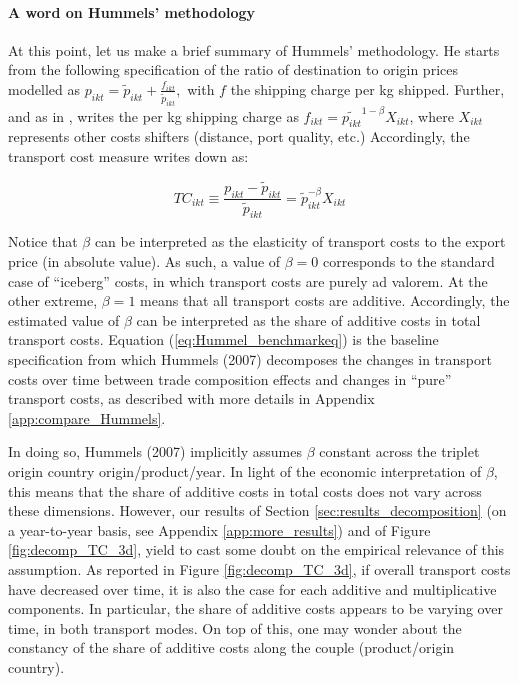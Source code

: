 \documentclass[a4paper,11pt]{article}
\begin{document}
\paragraph{A word on Hummels' methodology} At this point, let us make a brief summary of Hummels' methodology\nocite{hummels2007}. He starts from the following specification of the ratio of destination to origin prices modelled as $p_{ikt} = \widetilde{p}_{ikt}+\frac{f_{ikt}}{ \widetilde{p}_{ikt}},$ with $f$ the shipping charge per kg shipped. Further, and as in \cite{hummels_skiba}, \cite{hummels2007} writes the per kg shipping charge as $f_{ikt}=\widetilde{p_{ikt}}^{1-\beta}X_{ikt}$, where $X_{ikt}$ represents other costs shifters (distance, port quality, etc.) Accordingly, the transport cost measure writes down as:

\begin{equation}
TC_{ikt}\equiv \frac{p_{ikt}-\widetilde{p}_{ikt}}{\widetilde{p}_{ikt}} = \widetilde{p}_{ikt}^{-\beta}X_{ikt} \label{eq:Hummel_benchmarkeq}
\end{equation}

Notice that $\beta$ can be interpreted as the elasticity of transport costs to the export price (in absolute value). As such, a value of $\beta = 0$ corresponds to the standard case of ``iceberg'' costs, in which transport costs are purely ad valorem. At the other extreme, $\beta = 1$ means that all transport costs are additive. Accordingly, the estimated value of $\beta$ can be interpreted as the share of additive costs in total transport costs. Equation (\ref{eq:Hummel_benchmarkeq}) is the baseline specification from which Hummels (2007) decomposes the changes in transport costs over time between trade composition effects and changes in ``pure'' transport costs, as described with more details in Appendix \ref{app:compare_Hummels}.

In doing so, Hummels (2007) implicitly assumes $\beta$ constant across the triplet origin country origin/product/year. In light of the economic interpretation of $\beta$, this means that the share of additive costs in total costs does not vary across these dimensions. However, our results of Section \ref{sec:results_decomposition} (on a year-to-year basis, see Appendix \ref{app:more_results}) and of Figure \ref{fig:decomp_TC_3d}, yield to cast some doubt on the empirical relevance of this assumption. As reported in Figure \ref{fig:decomp_TC_3d}, if overall transport costs have decreased over time, it is also the case for each additive and multiplicative components. In particular, the share of additive costs appears to be varying over time, in both transport modes. On top of this, one may wonder about the constancy of the share of additive costs along the couple (product/origin country).
\end{document}
